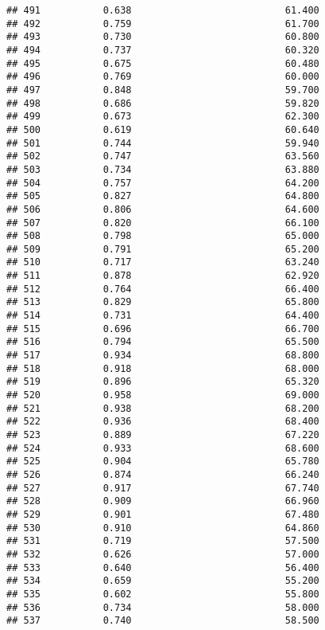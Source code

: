 \documentclass[
]{article}
\begin{document}
\begin{verbatim}
## 491           0.638                           61.400
## 492           0.759                           61.700
## 493           0.730                           60.800
## 494           0.737                           60.320
## 495           0.675                           60.480
## 496           0.769                           60.000
## 497           0.848                           59.700
## 498           0.686                           59.820
## 499           0.673                           62.300
## 500           0.619                           60.640
## 501           0.744                           59.940
## 502           0.747                           63.560
## 503           0.734                           63.880
## 504           0.757                           64.200
## 505           0.827                           64.800
## 506           0.806                           64.600
## 507           0.820                           66.100
## 508           0.798                           65.000
## 509           0.791                           65.200
## 510           0.717                           63.240
## 511           0.878                           62.920
## 512           0.764                           66.400
## 513           0.829                           65.800
## 514           0.731                           64.400
## 515           0.696                           66.700
## 516           0.794                           65.500
## 517           0.934                           68.800
## 518           0.918                           68.000
## 519           0.896                           65.320
## 520           0.958                           69.000
## 521           0.938                           68.200
## 522           0.936                           68.400
## 523           0.889                           67.220
## 524           0.933                           68.600
## 525           0.904                           65.780
## 526           0.874                           66.240
## 527           0.917                           67.740
## 528           0.909                           66.960
## 529           0.901                           67.480
## 530           0.910                           64.860
## 531           0.719                           57.500
## 532           0.626                           57.000
## 533           0.640                           56.400
## 534           0.659                           55.200
## 535           0.602                           55.800
## 536           0.734                           58.000
## 537           0.740                           58.500

\end{verbatim}
\end{document}
